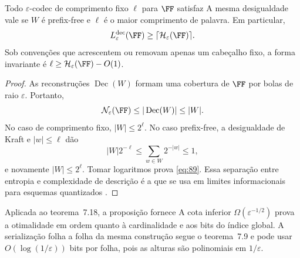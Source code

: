 \begin{proposicao}
Todo $\varepsilon$-codec de comprimento fixo $\ell$ para $\FF$ satisfaz
A mesma desigualdade vale se $W$ é prefix-free e $\ell$ é o maior comprimento de palavra. Em particular,
\[
L_\varepsilon^{\rm dec}(\FF)\ge\lceil\mathcal H_\varepsilon(\FF)\rceil.
\]
Sob convenções que acrescentem ou removam apenas um cabeçalho fixo, a forma invariante é $\ell\ge\mathcal H_\varepsilon(\FF)-O(1)$.
\end{proposicao}
\begin{proof}
As reconstruções $\operatorname{Dec}(W)$ formam uma cobertura de $\FF$ por bolas de raio $\varepsilon$. Portanto,
\[
\mathcal N_\varepsilon(\FF)\le|\operatorname{Dec}(W)|\le|W|.
\]
No caso de comprimento fixo, $|W|\le2^\ell$. No caso prefix-free, a desigualdade de Kraft e $|w|\le\ell$ dão
\[
|W|2^{-\ell}\le\sum_{w\in W}2^{-|w|}\le1,
\]
e novamente $|W|\le2^\ell$. Tomar logaritmos prova \eqref{eq:89}. Essa separação entre entropia e complexidade de descrição é a que se usa em limites informacionais para esquemas quantizados \citep{bolcskei2019}.
\end{proof}
Aplicada ao teorema~7.18, a proposição fornece
A cota inferior $\Omega(\varepsilon^{-1/2})$ prova a otimalidade em ordem quanto à cardinalidade e aos bits do índice global. A serialização folha a folha da mesma construção segue o teorema~7.9 e pode usar $O(\log(1/\varepsilon))$ bits por folha, pois as alturas são polinomiais em $1/\varepsilon$.
